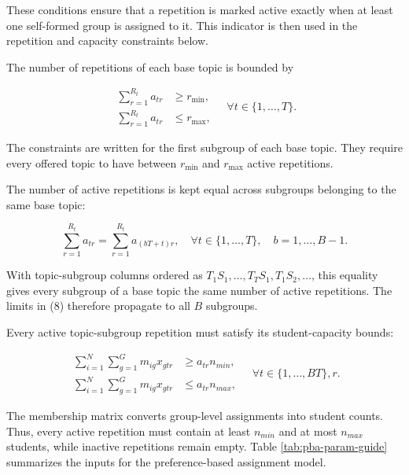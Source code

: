 These conditions ensure that a repetition is marked active exactly when at
least one self-formed group is assigned to it. This indicator is then used in
the repetition and capacity constraints below.

The number of repetitions of each base topic is bounded by

\[
\begin{aligned}
\sum_{r=1}^{R_t}a_{tr}&\geq r_{\min},\\
\sum_{r=1}^{R_t}a_{tr}&\leq r_{\max},
\end{aligned}
\quad \forall t\in\{1,\ldots,T\}. \tag{8}
\]

The constraints are written for the first subgroup of each base topic. They
require every offered topic to have between \(r_{\min}\) and \(r_{\max}\)
active repetitions.

The number of active repetitions is kept equal across subgroups belonging to
the same base topic:

\[
\sum_{r=1}^{R_t}a_{tr}
=\sum_{r=1}^{R_t}a_{(bT+t)r},
\quad \forall t\in\{1,\ldots,T\},\quad b=1,\ldots,B-1. \tag{9}
\]

With topic-subgroup columns ordered as \(T_1S_1,\ldots,T_TS_1,T_1S_2,\ldots\),
this equality gives every subgroup of a base topic the same number of active
repetitions. The limits in (8) therefore propagate to all \(B\) subgroups.

Every active topic-subgroup repetition must satisfy its student-capacity bounds:

\[
\begin{aligned}
\sum_{i=1}^{N}\sum_{g=1}^{G}m_{ig}x_{gtr}
&\geq a_{tr}n_{min},\\
\sum_{i=1}^{N}\sum_{g=1}^{G}m_{ig}x_{gtr}
&\leq a_{tr}n_{max},
\end{aligned}
\quad \forall t\in\{1,\ldots,BT\},r. \tag{10}
\]

The membership matrix converts group-level assignments into student counts.
Thus, every active repetition must contain at least \(n_{min}\) and at
most \(n_{max}\) students, while inactive repetitions remain empty. Table
\ref{tab:pba-param-guide} summarizes the inputs for the preference-based assignment
model.


